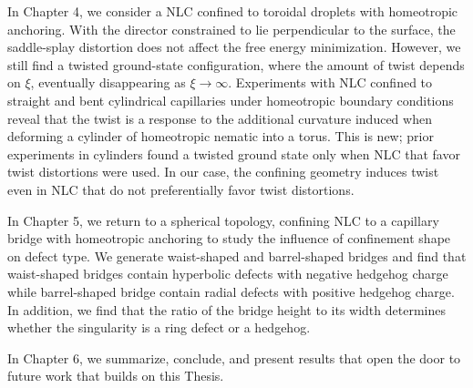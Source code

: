 In Chapter 4, we consider a NLC confined to toroidal droplets with homeotropic anchoring.
With the director constrained to lie perpendicular to the surface, the saddle-splay distortion does not affect the free energy minimization.
However, we still find a twisted ground-state configuration, where the amount of twist depends on $\xi$, eventually disappearing as $\xi \rightarrow \infty$.
Experiments with NLC confined to straight and bent cylindrical capillaries under homeotropic boundary conditions reveal that the twist is a response to the additional curvature induced when deforming a cylinder of homeotropic nematic into a torus.
This is new; prior experiments in cylinders found a twisted ground state only when NLC that favor twist distortions were used.
In our case, the confining geometry induces twist even in NLC that do not preferentially favor twist distortions.

In Chapter 5, we return to a spherical topology, confining NLC to a capillary bridge with homeotropic anchoring to study the influence of confinement shape on defect type.
We generate waist-shaped and barrel-shaped bridges and find that waist-shaped bridges contain hyperbolic defects with negative hedgehog charge while barrel-shaped bridge contain radial defects with positive hedgehog charge.
In addition, we find that the ratio of the bridge height to its width determines whether the singularity is a ring defect or a hedgehog.

In Chapter 6, we summarize, conclude, and present results that open the door to future work that builds on this Thesis.
